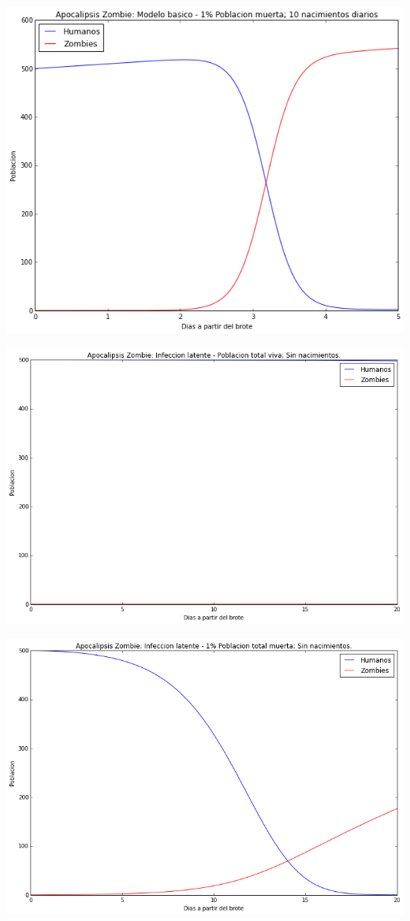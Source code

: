 \documentclass[12pt]{article}
\begin{document}
\begin{center}
\includegraphics[scale=0.5]{act11b2.png}
\end{center}

\begin{center}
\includegraphics[scale=0.5]{act11i.png}
\end{center}

\begin{center}
\includegraphics[scale=0.5]{act11i1.png}
\end{center}
\end{document}
